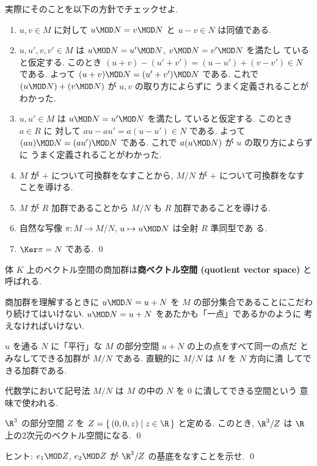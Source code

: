 \documentclass[12pt,twoside]{jarticle}
\begin{document}
\begin{question}
  実際にそのことを以下の方針でチェックせよ.
  \begin{enumerate}
  \item $u,v\in M$ に対して $u\MOD N=v\MOD N$ と $u-v\in N$ は同値である.
  \item $u,u',v,v'\in M$ は $u\MOD N=u'\MOD N$, $v\MOD N=v'\MOD N$ を満たし
    ていると仮定する.  このとき $(u+v)-(u'+v')=(u-u')+(v-v')\in N$ である.
    よって $(u+v)\MOD N = (u'+v')\MOD N$ である.
    これで $(u\MOD N) + (v\MOD N)$ が $u,v$ の取り方によらずに
    うまく定義されることがわかった.
  \item $u,u'\in M$ は $u\MOD N=u'\MOD N$ を満たし
    ていると仮定する.  このとき $a\in R$ に
    対して $au-au'=a(u-u')\in N$ である.
    よって $(au)\MOD N = (au')\MOD N$ である.
    これで $a(u\MOD N)$ が $u$ の取り方によらずに
    うまく定義されることがわかった.
  \item $M$ が $+$ について可換群をなすことから, 
    $M/N$ が $+$ について可換群をなすことを導ける.
  \item $M$ が $R$ 加群であることから $M/N$ も $R$ 加群であることを導ける.
  \item 自然な写像 $\pi:M\to M/N$, $u\mapsto u\MOD N$ は全射 $R$ 準同型であ
    る.
  \item $\Ker\pi = N$ である.
    \qed
  \end{enumerate}
\end{question}
体 $K$ 上のベクトル空間の商加群は{\bf 商ベクトル空間 (quotient vector
space)} と呼ばれる.

商加群を理解するときに $u\MOD N = u + N$ を $M$ の部分集合であることにこだわ
り続けてはいけない.  $u\MOD N = u + N$ をあたかも「一点」であるかのように
考えなければいけない.

$u$ を通る $N$ に「平行」な $M$ の部分空間 $u+N$ の上の点をすべて同一の点だ
とみなしてできる加群が $M/N$ である.  直観的に $M/N$ は $M$ を $N$ 方向に潰
してできる加群である.

代数学において記号法 $M/N$ は $M$ の中の $N$ を $0$ に潰してできる空間という
意味で使われる.


\begin{question}
  $\R^3$ の部分空間 $Z$ を $Z=\{\,(0,0,z)\mid z\in\R\,\}$ と定める.
  このとき, $\R^3/Z$ は $\R$ 上の2次元のベクトル空間になる.
  \qed
\end{question}

\noindent
ヒント: $e_1\MOD Z$, $e_2\MOD Z$ が $\R^3/Z$ の基底をなすことを示せ. \qed
\end{document}
